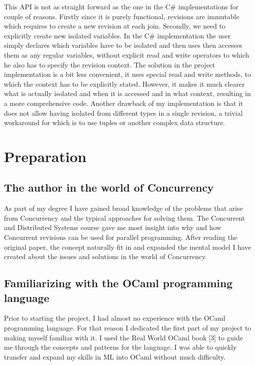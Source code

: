 \documentclass[12pt,twoside,notitlepage]{report}
\begin{document}
This API is not as straight forward as the one in the C\# implementations for couple of reasons. Firstly since it is purely functional, revisions are immutable which requires to create a new revision at each join. Secondly, we need to explicitly create new isolated variables. In the C\# implementation the user simply declares which variables have to be isolated and then uses then accesses them as any regular variables, without explicit read and write operators to which he also has to specify the revision context. The solution in the project implementation is a bit less convenient, it uses special read and write methods, to which the context has to be explicitly stated. However, it makes it much clearer what is actually isolated and when it is accessed and in what context, resulting in a more comprehensive code.  Another drawback of my implementation is that it does not allow having isolated from different types in a single revision, a trivial workaround for which is to use tuples or another complex data structure.  




\cleardoublepage



\chapter{Preparation}
\section{The author in the world of Concurrency}
As part of my degree I have gained broad knowledge of the problems that arise from Concurrency and the typical approaches for solving them. The Concurrent and Distributed Systems course gave me most insight into why and how Concurrent revisions can be used for parallel programming. After reading the original paper, the concept naturally fit in and expanded the mental model I have created about the issues and solutions in the world of Concurrency.  

\section{Familiarizing with the OCaml programming language}
Prior to starting the project, I had almost no experience with the OCaml programming language. For that reason I dedicated the first part of my project to making myself familiar with it. I used the Real World OCaml book [3] to guide me through the concepts and patterns for the language. I was able to quickly transfer and expand my skills in ML into OCaml without much difficulty.
\end{document}
